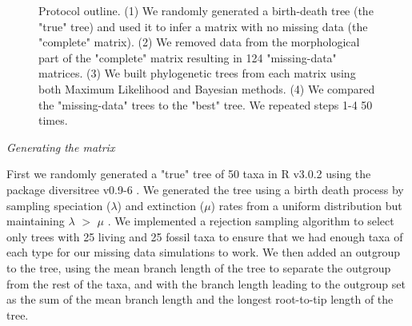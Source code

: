 \documentclass[12pt,letterpaper]{article}
\renewcommand{\subsection}[1]{%
\bigskip
\begin{center}
\begin{large}
\normalfont\itshape #1
\end{large}
\end{center}}
\begin{document}
\begin{figure}
\caption{Protocol outline.
(1) We randomly generated a birth-death tree (the "true" tree) and used it to infer a matrix with no missing data (the "complete" matrix).
(2) We removed data from the morphological part of the "complete" matrix resulting in 124 "missing-data" matrices.
(3) We built phylogenetic trees from each matrix using both Maximum Likelihood and Bayesian methods.
(4) We compared the "missing-data" trees to the "best" tree.
We repeated steps 1-4 50 times.}
\label{Fig_Outline}
\end{figure}




\subsection{Generating the matrix}
First we randomly generated a "true" tree of 50 taxa in R v3.0.2 \citep{R302} using the package diversitree v0.9-6 \citep{fitzjohndiversitree2012}.
We generated the tree using a birth death process by sampling speciation ($\lambda$) and extinction ($\mu$) rates from a uniform distribution but maintaining $\lambda$ $>$ $\mu$ \citep{paradistime-dependent2011}.
We implemented a rejection sampling algorithm to select only trees with 25 living and 25 fossil taxa to ensure that we had enough taxa of each type for our missing data simulations to work.
We then added an outgroup to the tree, using the mean branch length of the tree to separate the outgroup from the rest of the taxa, and with the branch length leading to the outgroup set as the sum of the mean branch length and the longest root-to-tip length of the tree.
\end{document}
